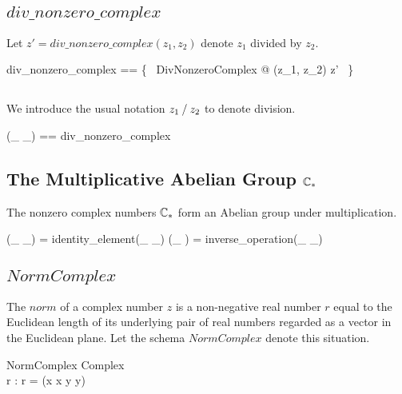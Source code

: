 \documentclass[11pt, oneside]{article}
\begin{document}
\subsection{$div\_nonzero\_complex$}

Let $z' = div\_nonzero\_complex(z_1, z_2)$ denote $z_1$ divided by $z_2$.

\begin{zed}
	div\_nonzero\_complex == \{~ DivNonzeroComplex @ (z_1, z_2) \mapsto z' ~\}
\end{zed}

\subsection{}

We introduce the usual notation $z_1 \mathbin{/} z_2$ to denote division.

\begin{zed}
	(\_ \divCnz \_) == div\_nonzero\_complex
\end{zed}

\subsection{The Multiplicative Abelian Group $\mathbb{C}_{*}$}

\begin{theorem}
The nonzero complex numbers $\mathbb{C}_{*}$ form an Abelian group under multiplication.

\begin{zed}
(\_ \mulCnz \_) \in \abgroup \Cnz
\also
\oneC = identity\_element(\_ \mulCnz \_)
\also
(\_ \invCnz) = inverse\_operation(\_ \mulCnz \_)
\end{zed}

\end{theorem}

\subsection{$NormComplex$}

The $norm$ of a complex number $z$ is a non-negative real number $r$
equal to the Euclidean length of its underlying pair of real numbers regarded
as a vector in the Euclidean plane.
Let the schema $NormComplex$ denote this situation.

\begin{schema}{NormComplex}
	Complex \\
	r : \R
\where
	r = \sqrtR(x \mulR x \addR y \mulR y)
\end{schema}
\end{document}
